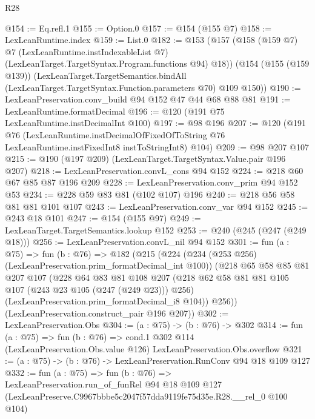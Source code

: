 \begin{lexlean}{R28}
\begin{coremodule}
@154 := Eq.refl.{1}
@155 := Option.{0}
@157 := @154 (@155 @7)
@158 := LexLeanRuntime.index
@159 := List.{0}
@182 := @153
    (@157
      (@158
        (@159 @7)
        @7
        (LexLeanRuntime.instIndexableList @7)
        (LexLeanTarget.TargetSyntax.Program.functions @94)
        @18))
    (@154
      (@155 (@159 @139))
      (LexLeanTarget.TargetSemantics.bindAll
        (LexLeanTarget.TargetSyntax.Function.parameters @70)
        @109
        @150))
@190 := LexLeanPreservation.conv_build @94 @152 @47 @44 @68 @88 @81
@191 := LexLeanRuntime.formatDecimal
@196 := @120 (@191 @75 LexLeanRuntime.instDecimalInt @100)
@197 := @98 @196
@207 := @120
    (@191
      @76
      (LexLeanRuntime.instDecimalOfFixedOfToString
        @76
        LexLeanRuntime.instFixedInt8
        instToStringInt8)
      @104)
@209 := @98 @207 @107
@215 := @190 (@197 @209) (LexLeanTarget.TargetSyntax.Value.pair @196 @207)
@218 := LexLeanPreservation.convL_cons @94 @152
@224 := @218 @60 @67 @85 @87 @196 @209
@228 := LexLeanPreservation.conv_prim @94 @152 @53
@234 := @228 @59 @83 @81 (@102 @107) @196
@240 := @218 @56 @58 @81 @81 @101 @107
@243 := LexLeanPreservation.conv_var @94 @152
@245 := @243 @18 @101
@247 := @154 (@155 @97)
@249 := LexLeanTarget.TargetSemantics.lookup @152
@253 := @240 (@245 (@247 (@249 @18)))
@256 := LexLeanPreservation.convL_nil @94 @152
@301 := fun (a : @75) =>
  fun (b : @76) =>
  @182
    (@215
      (@224
        (@234 (@253 @256) (LexLeanPreservation.prim_formatDecimal_int @100))
        (@218
          @65
          @58
          @85
          @81
          @207
          @107
          (@228
            @64
            @83
            @81
            @108
            @207
            (@218 @62 @58 @81 @81 @105 @107 (@243 @23 @105 (@247 (@249 @23))) @256)
            (LexLeanPreservation.prim_formatDecimal_i8 @104))
          @256))
      (LexLeanPreservation.construct_pair @196 @207))
@302 := LexLeanPreservation.Obs
@304 := (a : @75) -> (b : @76) -> @302
@314 := fun (a : @75) =>
  fun (b : @76) =>
  cond.{1} @302 @114 (LexLeanPreservation.Obs.value @126) LexLeanPreservation.Obs.overflow
@321 := (a : @75) -> (b : @76) -> LexLeanPreservation.RunConv @94 @18 @109 @127
@332 := fun (a : @75) =>
  fun (b : @76) =>
  LexLeanPreservation.run_of_funRel
    @94
    @18
    @109
    @127
    (LexLeanPreserve.C9967bbbe5c2047f57dda9119fe75d35e.R28.__rel_0 @100 @104)
\end{coremodule}
\end{lexlean}
